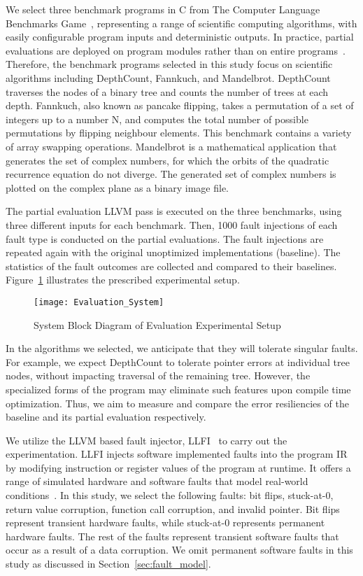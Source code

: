 We select three benchmark programs in C from The Computer Language Benchmarks Game~\cite{BenchmarkSuite}, representing a range of scientific computing algorithms, with easily configurable program inputs and deterministic outputs.
In practice, partial evaluations are deployed on program modules rather than on entire programs~\cite{Jones1993}.
Therefore, the benchmark programs selected in this study focus on scientific algorithms including DepthCount, Fannkuch, and Mandelbrot.
DepthCount traverses the nodes of a binary tree and counts the number of trees at each depth.
Fannkuch, also known as pancake flipping, takes a permutation of a set of integers up to a number N, and computes the total number of possible permutations by flipping neighbour elements.
This benchmark contains a variety of array swapping operations.
Mandelbrot is a mathematical application that generates the set of complex numbers, for which the orbits of the quadratic recurrence equation do not diverge.
The generated set of complex numbers is plotted on the complex plane as a binary image file.

The partial evaluation LLVM pass is executed on the three benchmarks, using three different inputs for each benchmark.
Then, 1000 fault injections of each fault type is conducted on the partial evaluations.
The fault injections are repeated again with the original unoptimized implementations (baseline).
The statistics of the fault outcomes are collected and compared to their baselines. 
Figure~\ref{fig:evaluation_sys} illustrates the prescribed experimental setup.

\begin{figure}[htbp]
  \centering
  \texttt{[image: Evaluation\_System]}
  \caption{System Block Diagram of Evaluation Experimental Setup}
  \label{fig:evaluation_sys}
\end{figure}

In the algorithms we selected, we anticipate that they will tolerate singular faults.
For example, we expect DepthCount to tolerate pointer errors at individual tree nodes, without impacting traversal of the remaining tree.
However, the specialized forms of the program may eliminate such features upon compile time optimization.
Thus, we aim to measure and compare the error resiliencies of the baseline and its partial evaluation respectively.

We utilize the LLVM based fault injector, LLFI~\cite{LLFI} to carry out the experimentation.
LLFI injects software implemented faults into the program IR by modifying instruction or register values of the program at runtime.
It offers a range of simulated hardware and software faults that model real-world conditions~\cite{V2005}.
In this study, we select the following faults: bit flips, stuck-at-0, return value corruption, function call corruption, and invalid pointer.
Bit flips represent transient hardware faults, while stuck-at-0 represents permanent hardware faults. 
The rest of the faults represent transient software faults that occur as a result of a data corruption.
We omit permanent software faults in this study as discussed in Section~\ref{sec:fault_model}.

